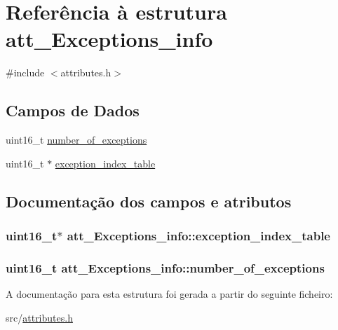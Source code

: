 \hypertarget{structatt__Exceptions__info}{}\section{Referência à estrutura att\+\_\+\+Exceptions\+\_\+info}
\label{structatt__Exceptions__info}


{\ttfamily \#include $<$attributes.\+h$>$}

\subsection*{Campos de Dados}
\begin{DoxyCompactItemize}
\item 
uint16\+\_\+t \hyperlink{structatt__Exceptions__info_aa118cef845f2ff9472572598b79ef635}{number\+\_\+of\+\_\+exceptions}
\item 
uint16\+\_\+t $\ast$ \hyperlink{structatt__Exceptions__info_ae713b303537b79289f22216ddbcbfd56}{exception\+\_\+index\+\_\+table}
\end{DoxyCompactItemize}


\subsection{Documentação dos campos e atributos}
\subsubsection[{\texorpdfstring{exception\+\_\+index\+\_\+table}{exception_index_table}}]{\setlength{\rightskip}{0pt plus 5cm}uint16\+\_\+t$\ast$ att\+\_\+\+Exceptions\+\_\+info\+::exception\+\_\+index\+\_\+table}\hypertarget{structatt__Exceptions__info_ae713b303537b79289f22216ddbcbfd56}{}\label{structatt__Exceptions__info_ae713b303537b79289f22216ddbcbfd56}
\subsubsection[{\texorpdfstring{number\+\_\+of\+\_\+exceptions}{number_of_exceptions}}]{\setlength{\rightskip}{0pt plus 5cm}uint16\+\_\+t att\+\_\+\+Exceptions\+\_\+info\+::number\+\_\+of\+\_\+exceptions}\hypertarget{structatt__Exceptions__info_aa118cef845f2ff9472572598b79ef635}{}\label{structatt__Exceptions__info_aa118cef845f2ff9472572598b79ef635}


A documentação para esta estrutura foi gerada a partir do seguinte ficheiro\+:\begin{DoxyCompactItemize}
\item 
src/\hyperlink{attributes_8h}{attributes.\+h}\end{DoxyCompactItemize}
